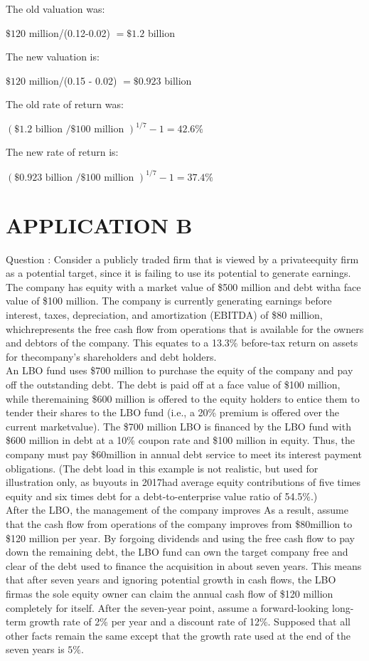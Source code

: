 \documentclass[11pt]{article}
\begin{document}
The old valuation was:

$\$ 120$ million/(0.12-0.02) $=\$ 1.2$ billion

The new valuation is:

$\$ 120$ million/(0.15 - 0.02) $=\$ 0.923$ billion

The old rate of return was:

$(\$ 1.2 \text { billion } / \$ 100 \text { million })^{1 / 7}-1=42.6 \%$

The new rate of return is:

$(\$ 0.923 \text { billion } / \$ 100 \text { million })^{1 / 7}-1=37.4 \%$

\section*{APPLICATION B}
Question : Consider a publicly traded firm that is viewed by a privateequity firm as a potential target, since it is failing to use its potential to generate earnings. The company has equity with a market value of \$500 million and debt witha face value of \$100 million. The company is currently generating earnings before interest, taxes, depreciation, and amortization (EBITDA) of \$80 million, whichrepresents the free cash flow from operations that is available for the owners and debtors of the company. This equates to a 13.3\% before-tax return on assets for thecompany’s shareholders and debt holders.\\
An LBO fund uses \$700 million to purchase the equity of the company and pay off the outstanding debt. The debt is paid off at a face value of \$100 million, while theremaining \$600 million is offered to the equity holders to entice them to tender their shares to the LBO fund (i.e., a 20\% premium is offered over the current marketvalue). The \$700 million LBO is financed by the LBO fund with \$600 million in debt at a 10\% coupon rate and \$100 million in equity. Thus, the company must pay \$60million in annual debt service to meet its interest payment obligations. (The debt load in this example is not realistic, but used for illustration only, as buyouts in 2017had average equity contributions of five times equity and six times debt for a debt-to-enterprise value ratio of 54.5\%.)\\
After the LBO, the management of the company improves As a result, assume that the cash flow from operations of the company improves from \$80million to \$120 million per year. By forgoing dividends and using the free cash flow to pay down the remaining debt, the LBO fund can own the target company free and clear of the debt used to finance the acquisition in about seven years. This means that after seven years and ignoring potential growth in cash flows, the LBO firmas the sole equity owner can claim the annual cash flow of \$120 million completely for itself. After the seven-year point, assume a forward-looking long-term growth rate of 2\% per year and a discount rate of 12\%. Supposed that all other facts remain the same except that the growth rate used at the end of the seven years is $5 \%$.
\end{document}
